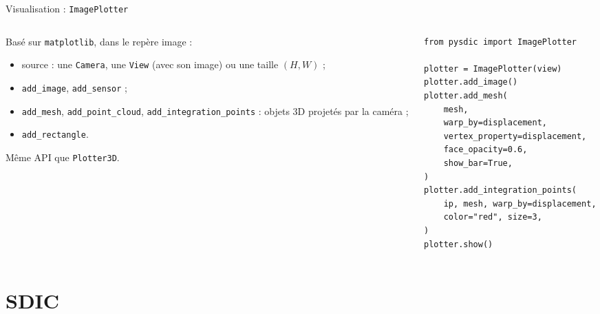 \documentclass[aspectratio=169,11pt]{beamer}
\newcommand{\code}[1]{\texttt{\small #1}}
\newcommand{\cls}[1]{\textcolor{pyblue}{\texttt{#1}}}
\begin{document}
\begin{frame}[fragile]{Visualisation : \texttt{ImagePlotter}}
  \begin{columns}[T]
    \begin{column}{0.42\textwidth}
      Basé sur \texttt{matplotlib}, dans le \alert{repère image} :
      \begin{itemize}\small
        \item source : une \cls{Camera}, une \cls{View} (avec son image) ou
              une taille $(H, W)$ ;
        \item \code{add\_image}, \code{add\_sensor} ;
        \item \code{add\_mesh}, \code{add\_point\_cloud},
              \code{add\_integration\_points} : objets 3D \alert{projetés} par
              la caméra ;
        \item \code{add\_rectangle}.
      \end{itemize}
      \medskip
      \small Même API que \cls{Plotter3D}.
    \end{column}
    \begin{column}{0.56\textwidth}
\begin{lstlisting}
from pysdic import ImagePlotter
 
plotter = ImagePlotter(view)
plotter.add_image()
plotter.add_mesh(
    mesh,
    warp_by=displacement,
    vertex_property=displacement,
    face_opacity=0.6,
    show_bar=True,
)
plotter.add_integration_points(
    ip, mesh, warp_by=displacement,
    color="red", size=3,
)
plotter.show()
\end{lstlisting}
    \end{column}
  \end{columns}
\end{frame}
 
\section{SDIC}
 
\end{document}
